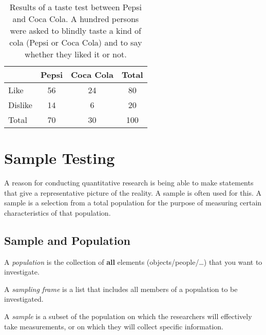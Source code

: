 \begin{table}
    \centering
    \begin{tabular}{l|cc|c}
                  & Pepsi & Coca Cola & Total \\
        \midrule
        Like      &  56   &    24     &   80  \\
        Dislike   &  14   &     6     &   20  \\
        \midrule
        Total     &  70   &    30     &  100
    \end{tabular}
    \caption[Results of a taste test between Pepsi and Coca Cola.]{Results of a taste test between Pepsi and Coca Cola. A hundred persons were asked to blindly taste a kind of cola (Pepsi or Coca Cola) and to say whether they liked it or not.}
    \label{tab:pepsi-coca}
\end{table}

\section{Sample Testing}
\label{sec:onderzoeksproces-steekproefonderzoek}

A reason for conducting quantitative research is being able to make statements that give a representative picture of the reality. A sample is often used for this. A sample is a selection from a total population for the purpose of measuring certain characteristics of that population.

\subsection{Sample and Population}

\begin{definition}[Population]
    A \emph{population} is the collection of \textbf{all} elements (objects/people/\ldots) that you want to investigate.
\end{definition}

\begin{definition}
    A \emph{sampling frame} is a list that includes all members of a population to be investigated.
\end{definition}

\begin{definition}[Sample]
    A \emph{sample} is a subset of the population on which the researchers will effectively take measurements, or on which they will collect specific information.
\end{definition}

